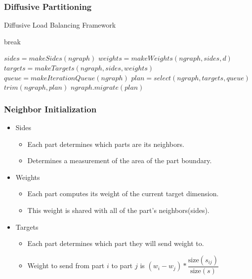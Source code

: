 \documentclass{beamer}
\begin{document}
\begin{frame}
  \frametitle{Diffusive Partitioning}
  \begin{algorithm}[H]
    \caption{Diffusive Load Balancing Framework}
    \label{alg:engpar}
    \small
    \begin{algorithmic}[1]
      \State break
      \EndIf
      \EndWhile
      \EndFor
      \EndProcedure

      \State $sides = makeSides(ngraph)$
      \State $weights = makeWeights(ngraph,sides,d)$
      \State $targets = makeTargets(ngraph,sides,weights)$
      \State $queue = makeIterationQueue(ngraph)$
      \State $plan = select(ngraph,targets,queue)$
      \State $trim(ngraph,plan)$
      \State $ngraph.migrate(plan)$
      \EndProcedure
    \end{algorithmic}
  \end{algorithm}
\end{frame}

\begin{frame}
  \frametitle{Neighbor Initialization}
  \begin{itemize}
  \item Sides
    \begin{itemize}
    \item Each part determines which parts are its neighbors.
    \item Determines a measurement of the area of the part boundary.
    \end{itemize}
  \item Weights
    \begin{itemize}
    \item Each part computes its weight of the current target dimension.
    \item This weight is shared with all of the part's neighbors(sides).
    \end{itemize}
  \item Targets
    \begin{itemize}
    \item Each part determines which part they will send weight to.
    \item Weight to send from part $i$ to part $j$ is $(w_i-w_j)*\dfrac{\text{size}(s_{ij})}{\text{size}(s)}$
    \end{itemize}
  \end{itemize}
\end{frame}
\end{document}
